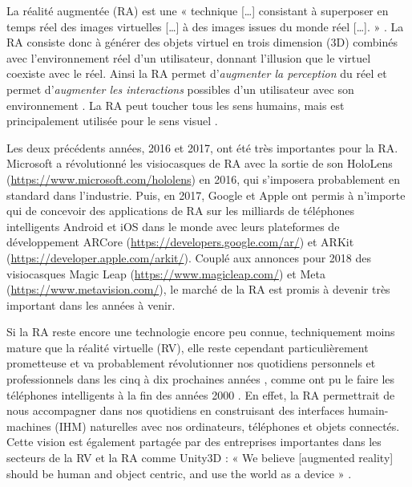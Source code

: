 La réalité augmentée (RA) est une « technique [\dots] consistant à superposer en temps réel des images virtuelles [\dots] à des images issues du monde réel [\dots]. » \citep{OQLFRA2017}. La RA consiste donc à générer des objets virtuel en trois dimension (3D) combinés avec l'environnement réel d'un utilisateur, donnant l'illusion que le virtuel coexiste avec le réel. Ainsi la RA permet d'\emph{augmenter la perception} du réel et permet d'\emph{augmenter les interactions} possibles d'un utilisateur avec son environnement \citep{Azuma1997}. La RA peut toucher tous les sens humains, mais est principalement utilisée pour le sens visuel .

Les deux précédents années, 2016 et 2017, ont été très importantes pour la RA. Microsoft a révolutionné les visiocasques de RA avec la sortie de son HoloLens (\url{https://www.microsoft.com/hololens}) en 2016, qui s'imposera probablement en standard dans l'industrie. Puis, en 2017, Google et Apple ont permis à n'importe qui de concevoir des applications de RA sur les milliards de téléphones intelligents Android et iOS dans le monde avec leurs plateformes de développement ARCore (\url{https://developers.google.com/ar/}) et ARKit (\url{https://developer.apple.com/arkit/}). Couplé aux annonces pour 2018 des visiocasques Magic Leap (\url{https://www.magicleap.com/}) et Meta (\url{https://www.metavision.com/}), le marché de la RA est promis à devenir très important dans les années à venir.


Si la RA reste encore une technologie encore peu connue, techniquement moins mature que la réalité virtuelle (RV), elle reste cependant particulièrement prometteuse et va probablement révolutionner nos quotidiens personnels et professionnels dans les cinq à dix prochaines années , comme ont pu le faire les téléphones intelligents à la fin des années 2000 \citep{Chaffey2018}. En effet, la RA permettrait de nous accompagner dans nos quotidiens en construisant des interfaces humain-machines (IHM) naturelles avec nos ordinateurs, téléphones et objets connectés. Cette vision est également partagée par des entreprises importantes dans les secteurs de la RV et la RA comme Unity3D : « We believe [augmented reality] should be human and object centric, and use the world as a device » \citep{UnityFutureMRPartIII2017}.

